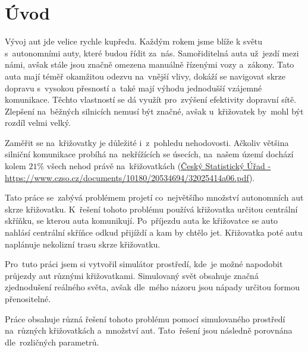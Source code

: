\chapter*{Úvod}\label{ch:uvod}

Vývoj aut jde velice rychle kupředu.
Každým rokem jsme blíže k světu s~autonomními auty, které budou řídit za~nás.
Samořiditelná auta už~jezdí mezi námi, avšak stále jsou značně omezena manuálně řízenými vozy a~zákony.
Tato auta mají téměř okamžitou odezvu na~vnější vlivy, dokáží se navigovat skrze dopravu s~vysokou přesností
a~také mají výhodu jednodušší vzájemné komunikace.
Těchto vlastností se dá využít pro~zvýšení efektivity dopravní sítě.
Zlepšení na~běžných silnicích nemusí být značné, avšak u~křižovatek by~mohl být rozdíl velmi velký.

Zaměřit se na~křižovatky je důležité i~z~pohledu nehodovosti.
Ačkoliv většina silniční komunikace probíhá na~nekřížících se úsecích, na~našem území dochází kolem $21\%$ všech nehod
právě na~křižovatkách (\href{https://www.czso.cz/documents/10180/20534694/32025414a06.pdf}
{Český Statistický Úřad - https://www.czso.cz/documents/10180/20534694/32025414a06.pdf}).

Tato práce se~zabývá problémem projetí co~největšího množství autonomních aut skrze křižovatku.
K~řešení tohoto problému používá křižovatka určitou centrální skříňku, se kterou auta komunikují.
Po~příjezdu auta ke křižovatce se auto nahlásí centrální skříňce odkud přijíždí a kam by chtělo jet.
Křižovatka poté autu naplánuje nekolizní trasu skrze křižovatku.

Pro~tuto práci jsem si vytvořil simulátor prostředí, kde~je možné napodobit průjezdy aut různými křižovatkami.
Simulovaný svět obsahuje značná zjednodušení reálného světa, avšak dle~mého názoru jsou nápady určitou formou přenositelné.

Práce obsahuje různá řešení tohoto problému pomocí simulovaného prostředí na~různých křižovatkách a~množství aut.
Tato~řešení jsou následně porovnána dle~rozličných parametrů.
